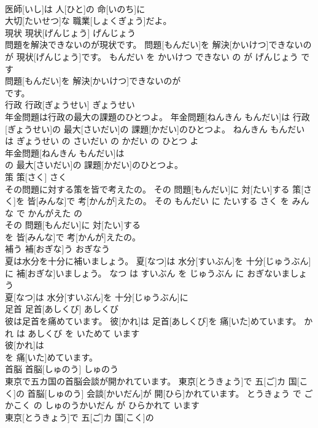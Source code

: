 \documentclass[8pt]{extreport}
\begin{document}
\begin{CJK}{UTF8}{min}
\\	医師[いし]は 人[ひと]の 命[いのち]に
\\	大切[たいせつ]な 職業[しょくぎょう]だよ。			
\\	現状	現状[げんじょう]	げんじょう	
\\	問題を解決できないのが現状です。	問題[もんだい]を 解決[かいけつ]できないのが 現状[げんじょう]です。	もんだい を かいけつ できない の が げんじょう です	
\\	問題[もんだい]を 解決[かいけつ]できないのが
\\	です。			
\\	行政	行政[ぎょうせい]	ぎょうせい	
\\	年金問題は行政の最大の課題のひとつよ。	年金問題[ねんきん もんだい]は 行政[ぎょうせい]の 最大[さいだい]の 課題[かだい]のひとつよ。	ねんきん もんだい は ぎょうせい の さいだい の かだい の ひとつ よ	
\\	年金問題[ねんきん もんだい]は
\\	の 最大[さいだい]の 課題[かだい]のひとつよ。			
\\	策	策[さく]	さく	
\\	その問題に対する策を皆で考えたの。	その 問題[もんだい]に 対[たい]する 策[さく]を 皆[みんな]で 考[かんが]えたの。	その もんだい に たいする さく を みんな で かんがえた の	
\\	その 問題[もんだい]に 対[たい]する
\\	を 皆[みんな]で 考[かんが]えたの。			
\\	補う	補[おぎな]う	おぎなう	
\\	夏は水分を十分に補いましょう。	夏[なつ]は 水分[すいぶん]を 十分[じゅうぶん]に 補[おぎな]いましょう。	なつ は すいぶん を じゅうぶん に おぎないましょう	
\\	夏[なつ]は 水分[すいぶん]を 十分[じゅうぶん]に
\\	足首	足首[あしくび]	あしくび	
\\	彼は足首を痛めています。	彼[かれ]は 足首[あしくび]を 痛[いた]めています。	かれ は あしくび を いためて います	
\\	彼[かれ]は
\\	を 痛[いた]めています。			
\\	首脳	首脳[しゅのう]	しゅのう	
\\	東京で五カ国の首脳会談が開かれています。	東京[とうきょう]で 五[ご]カ 国[こく]の 首脳[しゅのう] 会談[かいだん]が 開[ひら]かれています。	とうきょう で ごかこく の しゅのうかいだん が ひらかれて います	
\\	東京[とうきょう]で 五[ご]カ 国[こく]の

\end{CJK}
\end{document}
